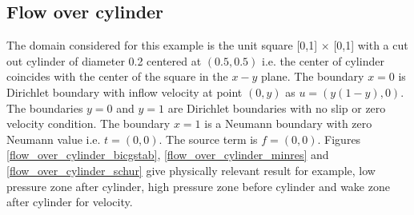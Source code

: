 \documentclass[a4paper,openany]{book}
\begin{document}
\subsection{Flow over cylinder} \label{flow_over_cylinder_stokes}

The domain considered for this example is the unit square [0,1] $\times$ [0,1] with a cut out cylinder of diameter 0.2 centered at $(0.5,0.5)$ i.e. the center of cylinder coincides with the center of the square in the $x-y$ plane. The boundary ${x=0}$ is Dirichlet boundary with inflow velocity at point $(0,y)$ as $u = (y(1-y), 0)$. The boundaries ${y = 0}$ and ${y = 1}$ are Dirichlet boundaries with no slip or zero velocity condition. The boundary ${x = 1}$ is a Neumann boundary with zero Neumann value i.e. $t = (0, 0)$. The source term is $f = (0, 0)$. Figures \ref{flow_over_cylinder_bicgstab}, \ref{flow_over_cylinder_minres} and \ref{flow_over_cylinder_schur} give physically relevant result for example, low pressure zone after cylinder, high pressure zone before cylinder and wake zone after cylinder for velocity.
\end{document}
